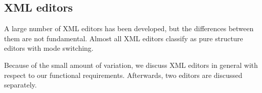 \fromHere  %


\ec

%																
\subsection{XML editors}

A large number of XML editors has been developed, but the differences between them are not fundamental. Almost all XML editors classify as pure structure editors with mode switching. 

Because of the small amount of variation, we discuss XML editors in general with respect to our functional requirements. Afterwards, two  editors are discussed separately.

